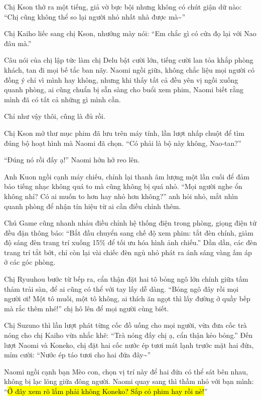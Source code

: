\documentclass[../main.tex]{subfiles}
\begin{document}
Chị Kson thở ra một tiếng, giả vờ bực bội nhưng không có chút giận dữ nào: ``Chị cũng không thể so lại người nhỏ nhất nhà được mà\~{}''

Chị Kaiho liếc sang chị Kson, nhướng mày nói: ``Em chắc gì có cửa đọ lại với Nao đâu mà.''

Câu nói của chị lập tức làm chị Delu bật cười lớn, tiếng cười lan tỏa khắp phòng khách, tan đi mọi bế tắc ban nãy. Naomi ngồi giữa, không chắc liệu mọi người có đồng ý chỉ vì mình hay không, nhưng khi thấy tất cả đều yên vị ngồi xuống quanh phòng, ai cũng chuẩn bị sẵn sàng cho buổi xem phim, Naomi biết rằng mình đã có tất cả những gì mình cần.

Chỉ như vậy thôi, cũng là đủ rồi.

\ct

Chị Kson mở thư mục phim đã lưu trên máy tính, lần lượt nhấp chuột để tìm đúng bộ hoạt hình mà Naomi đã chọn. ``Có phải là bộ này không, Nao-tan?''

``Đúng nó rồi đấy ạ!'' Naomi hớn hở reo lên.

Anh Kuon ngồi cạnh máy chiếu, chỉnh lại thanh âm lượng một lần cuối để đảm bảo tiếng nhạc không quá to mà cũng không bị quá nhỏ. ``Mọi người nghe ổn không nhỉ? Có ai muốn to hơn hay nhỏ hơn không?'' anh hỏi nhỏ, mắt nhìn quanh phòng để nhận tín hiệu từ ai cần điều chỉnh thêm.

Chú Game cũng nhanh nhảu điều chỉnh hệ thống điện trong phòng, giọng điện tử đều đặn thông báo: ``Bắt đầu chuyển sang chế độ xem phim: tắt đèn chính, giảm độ sáng đèn trang trí xuống 15\% để tối ưu hóa hình ảnh chiếu.'' Dần dần, các đèn trang trí tắt bớt, chỉ còn lại vài chiếc đèn ngủ nhỏ phát ra ánh sáng vàng ấm áp ở các góc phòng.

Chị Ryuuhou bước từ bếp ra, cẩn thận đặt hai tô bỏng ngô lớn chính giữa tấm thảm trải sàn, để ai cũng có thể với tay lấy dễ dàng. ``Bỏng ngô đây rồi mọi người ơi! Một tô muối, một tô không, ai thích ăn ngọt thì lấy đường ở quầy bếp mà rắc thêm nhé!'' chị hô lên để mọi người cùng biết.

Chị Suzuno thì lần lượt phát từng cốc đồ uống cho mọi người, vừa đưa cốc trà nóng cho chị Kaiho vừa nhắc khẽ: ``Trà nóng đấy chị ạ, cẩn thận kẻo bỏng.'' Đến lượt Naomi và Koneko, chị đặt hai cốc nước ép tươi mát lạnh trước mặt hai đứa, mỉm cười: ``Nước ép táo tươi cho hai đứa đây\~{}''

Naomi ngồi cạnh bạn Mèo con, chọn vị trí này để hai đứa có thể sát bên nhau, không bị lạc lõng giữa đông người. Naomi quay sang thì thầm nhỏ với bạn mình: ``\hl{Ở đây xem rõ lắm phải không Koneko? Sắp có phim hay rồi nè!}''
\end{document}
